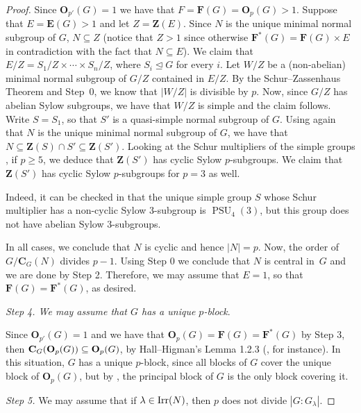 \documentclass[12pt]{amsart}
\theoremstyle{theorem}
\theoremstyle{definition}
\def\cent#1#2{{\bf C}_{#1}(#2)}
\def\cent#1#2{{\bf C}_{#1}(#2)}
\newcommand{\bC} {\mathbf C}
\newcommand{\bE} {\mathbf E}
\newcommand{\bF} {\mathbf F}
\newcommand{\bO}{{\mathbf O}}
\newcommand{\bZ} {\mathbf Z}
\newcommand{\PSU}{\operatorname{PSU}}
\begin{document}
\begin{proof}
		
		Since $\bO_{p'}(G)=1$ we have that $F=\bF(G)=\bO_p(G)>1$. Suppose that $E=\bE(G)>1$ and let $Z=\bZ(E)$.
		Since $N$ is the unique minimal normal subgroup of $G$, $N\subseteq Z$ (notice
		that $Z>1$ since otherwise $\bF^*(G)=\bF(G)\times E$ in contradiction with the fact that $N\subseteq E$). We claim that $E/Z=S_1/Z\times\cdots\times S_n/Z$, where
		$S_i\trianglelefteq G$ for every $i$. Let $W/Z$ be a (non-abelian) minimal
		normal subgroup of $G/Z$ contained in $E/Z$. By the Schur--Zassenhaus Theorem
		and Step~0, we know that $|W/Z|$ is divisible by $p$. Now, since $G/Z$ has abelian Sylow subgroups, we have that $W/Z$ is simple and the claim
		follows.
		Write $S=S_1$, so that $S'$ is a quasi-simple normal subgroup of $G$. Using
		again that $N$ is the unique minimal normal subgroup of $G$, we have that
		$N\subseteq \bZ(S)\cap S'\subseteq \bZ(S')$.
		Looking at the Schur multipliers of the simple groups \cite{GLS}, if $p\geq 5$,
		we deduce that $\bZ(S')$ has cyclic Sylow $p$-subgroups. We claim that
		$\bZ(S')$ has cyclic Sylow $p$-subgroups for $p=3$ %
		as well.
		
		Indeed, it can be checked in \cite{gap} that the unique simple group $S$ whose Schur
		multiplier has a non-cyclic Sylow $3$-subgroup is $\PSU_4(3)$, but this group
		does not have abelian Sylow $3$-subgroups.
		
		In all cases, we conclude that $N$ is cyclic and hence $|N|=p$. Now, the order
		of $G/\bC_G(N)$ divides $p-1$. Using Step 0 we conclude that $N$ is central
		in~$G$ and we are done by Step 2. Therefore, we may assume that $E=1$, so that 
		$\bF(G)=\bF^*(G)$, as desired.
		\bigskip
		
		\textit{Step 4. We may assume that $G$ has a unique $p$-block}.
		
		\medskip
		
		Since $\bO_{p'}(G)=1$ and we have that $\bO_p(G)=\bF(G)=\bF^*(G)$ by Step 3, then $\cent G {\bO_p(G)}\subseteq\bO_p(G)$, by Hall--Higman's Lemma 1.2.3 (\cite[Theorem 3.21]{FGT}, for instance). In this situation, $G$ has a unique $p$-block, since all blocks of $G$ cover the unique block of $\bO_p(G)$, but by \cite[Corollary 9.21]{NavarroBlocks}, the principal block of $G$ is the only block covering it.
		
		\bigskip
		
		\textit{Step 5.} We may assume that if $\lambda\in{\rm Irr}(N)$, then $p$ does not divide $|G:G_\lambda|$.
		
		\medskip
		

\end{proof}
\end{document}
